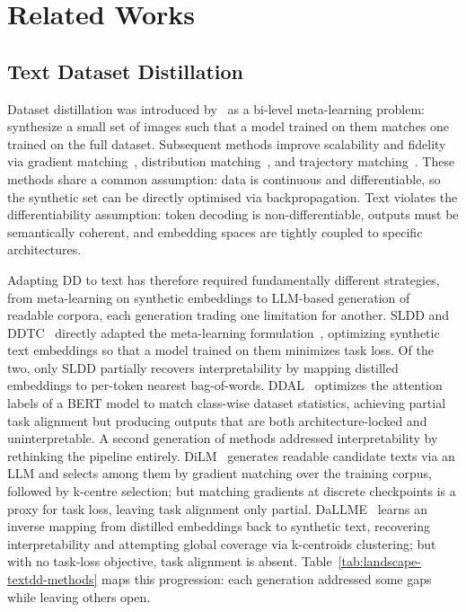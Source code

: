 \section{Related Works} \label{sec:02-related}
\subsection{Text Dataset Distillation} \label{sec:02-related-textdd}
\begin{foldable} %
  Dataset distillation was introduced by~\cite{wang2018dataset} as a bi-level meta-learning problem: synthesize a small set of images such that a model trained on them matches one trained on the full dataset.
  Subsequent methods improve scalability and fidelity via gradient matching~\cite{zhao2020dataset}, distribution matching~\cite{wang2022cafe}, and trajectory matching~\cite{cazenavette2022dataset,kim2022dataset}.
  These methods share a common assumption: data is continuous and differentiable, so the synthetic set can be directly optimised via backpropagation.
  Text violates the differentiability assumption: token decoding is non-differentiable, outputs must be semantically coherent, and embedding spaces are tightly coupled to specific architectures.
\end{foldable}

\begin{foldable} %
  Adapting DD to text has therefore required fundamentally different strategies, from meta-learning on synthetic embeddings to LLM-based generation of readable corpora, each generation trading one limitation for another.
  SLDD and DDTC~\cite{sucholutsky2021soft,li2021data} directly adapted the meta-learning formulation~\cite{wang2018dataset}, optimizing synthetic text embeddings so that a model trained on them minimizes task loss.
  Of the two, only SLDD partially recovers interpretability by mapping distilled embeddings to per-token nearest bag-of-words.
  DDAL~\cite{maekawa2023dataset} optimizes the attention labels of a BERT model to match class-wise dataset statistics, achieving partial task alignment but producing outputs that are both architecture-locked and uninterpretable.
  A second generation of methods addressed interpretability by rethinking the pipeline entirely.
  DiLM~\cite{maekawa2024dilm} generates readable candidate texts via an LLM and selects among them by gradient matching over the training corpus, followed by k-centre selection; but matching gradients at discrete checkpoints is a proxy for task loss, leaving task alignment only partial.
  DaLLME~\cite{tao2024textual} learns an inverse mapping from distilled embeddings back to synthetic text, recovering interpretability and attempting global coverage via k-centroids clustering; but with no task-loss objective, task alignment is absent.
  Table~\ref{tab:landscape-textdd-methods} maps this progression: each generation addressed some gaps while leaving others open.
\end{foldable}

